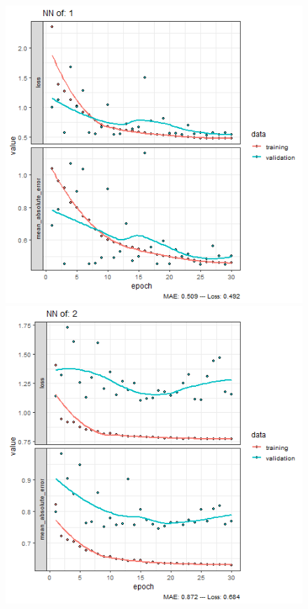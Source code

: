 \documentclass{FR16}
\begin{document}
\begin{figure}[!htb]
   \begin{minipage}{0.33\textwidth}
     \centering
     \includegraphics[width=1\linewidth]{figures/NN-1.png} 
   \end{minipage}\hfill
   \begin{minipage}{0.33\textwidth}
     \centering
     \includegraphics[width=1\linewidth]{figures/NN-2.png}

\end{minipage}
\end{figure}
\end{document}
